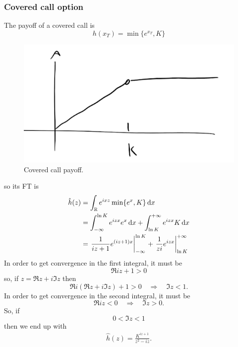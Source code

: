 \subsubsection{Covered call option}
The payoff of a covered call is
\begin{equation}
    h(x_T) = \min\{e^{x_T},K\}
\end{equation}
\begin{figure}
    \centering
    \includegraphics[scale=0.22]{fig/tmp/fig42}
    \caption{Covered call payoff.}
\end{figure}
so its FT is
\begin{align}
    \notag\hat{h}(z) &= \int_{\mathbb{R}} e^{ixz}\min\{e^x,K\}\,\dd x \\
    &=
    \notag\int_{-\infty}^{\ln K} e^{izx} e^x \,\dd x + \int_{\ln K}^{+\infty} e^{izx}K\,\dd x \\
    &=
    \eval{\frac{1}{iz+1}e^{(iz+1)x}}_{-\infty}^{\ln K} + \eval{\frac{1}{zi}e^{izx}}_{\ln K}^{+\infty}
\end{align}
In order to get convergence in the first integral, it must be
\begin{equation*}
    \Re{iz+1} > 0
\end{equation*}
so, if $z = \Re{z} + i\Im{z}$ then
\begin{equation*}
    \Re{i(\Re{z} + i\Im{z})+1} > 0 \quad\Rightarrow\quad \Im{z} < 1.
\end{equation*}
In order to get convergence in the second integral, it must be
\begin{equation*}
    \Re{iz} < 0 \quad\Rightarrow\quad \Im{z} > 0.
\end{equation*}
So, if
\begin{equation}\label{imdom}
    0 < \Im{z} < 1
\end{equation}
then we end up with
\begin{align}
    \hat{h}(z) = \frac{K^{iz+1}}{z^2-iz}.
\end{align}
